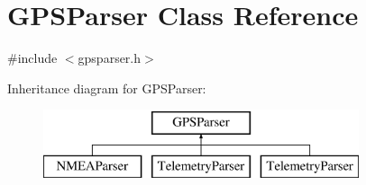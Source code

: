 \hypertarget{class_g_p_s_parser}{\section{\-G\-P\-S\-Parser \-Class \-Reference}
\label{class_g_p_s_parser}
}


{\ttfamily \#include $<$gpsparser.\-h$>$}

\-Inheritance diagram for \-G\-P\-S\-Parser\-:\begin{figure}[H]
\begin{center}
\leavevmode
\includegraphics[height=2.000000cm]{class_g_p_s_parser}
\end{center}
\end{figure}
